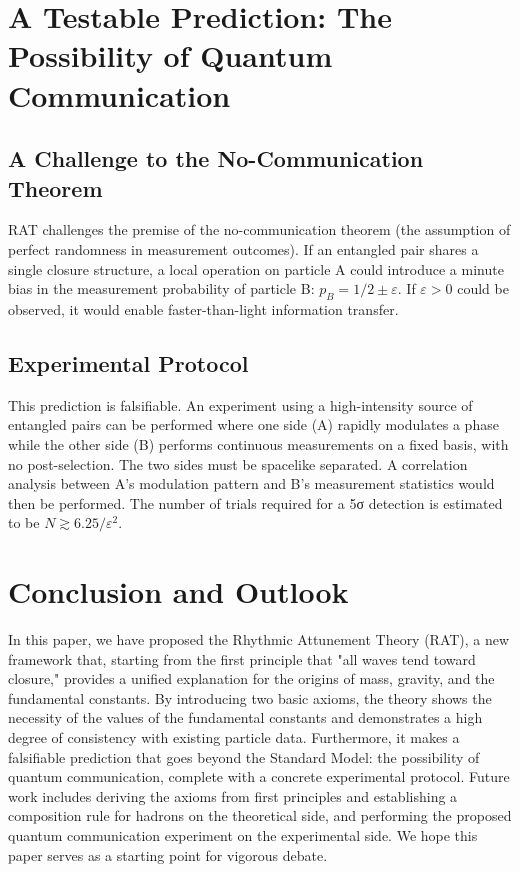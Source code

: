 \documentclass[11pt,a4paper]{article}
\begin{document}
\section{A Testable Prediction: The Possibility of Quantum Communication}
\subsection{A Challenge to the No-Communication Theorem}
RAT challenges the premise of the no-communication theorem (the assumption of perfect randomness in measurement outcomes). If an entangled pair shares a single closure structure, a local operation on particle A could introduce a minute bias in the measurement probability of particle B: $p_B = 1/2 \pm \varepsilon$. If $\varepsilon > 0$ could be observed, it would enable faster-than-light information transfer.
\subsection{Experimental Protocol}
This prediction is falsifiable. An experiment using a high-intensity source of entangled pairs can be performed where one side (A) rapidly modulates a phase while the other side (B) performs continuous measurements on a fixed basis, with no post-selection. The two sides must be spacelike separated. A correlation analysis between A's modulation pattern and B's measurement statistics would then be performed. The number of trials required for a 5σ detection is estimated to be $N \gtrsim 6.25 / \varepsilon^2$.

\section{Conclusion and Outlook}
In this paper, we have proposed the Rhythmic Attunement Theory (RAT), a new framework that, starting from the first principle that "all waves tend toward closure," provides a unified explanation for the origins of mass, gravity, and the fundamental constants. By introducing two basic axioms, the theory shows the necessity of the values of the fundamental constants and demonstrates a high degree of consistency with existing particle data. Furthermore, it makes a falsifiable prediction that goes beyond the Standard Model: the possibility of quantum communication, complete with a concrete experimental protocol. Future work includes deriving the axioms from first principles and establishing a composition rule for hadrons on the theoretical side, and performing the proposed quantum communication experiment on the experimental side. We hope this paper serves as a starting point for vigorous debate.
\end{document}
